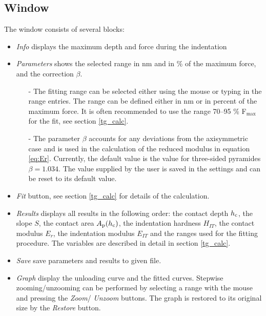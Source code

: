 \subsection{Window}
The window consists of several blocks:
\begin{itemize}
 \item \emph{Info} displays the maximum depth and force during the indentation
 \item \emph{Parameters} shows the selected range in nm and in \% of the maximum force, and the correction $\beta$. 
        \begin{itemize}
          \item[-] The fitting range can be selected either using the mouse or typing in the range entries. The range can be defined either in nm or in percent of the maximum force. 
                   It is often recommended to use the range 70--95 \% F$_\mathrm{max}$ for the fit, see section \ref{tg_calc}.  
          \item[-] The parameter $\beta$ accounts for any deviations from the axisymmetric case and is used in the calculation of the reduced modulus in equation \eqref{eq:Er}. 
                   Currently, the default value is the value for three-sided pyramides $\beta = 1.034$. The value supplied by the user is saved in the settings and can be reset to its default value.
        \end{itemize}
 \item \emph{Fit} button, see section \ref{tg_calc} for details of the calculation.
 \item \emph{Results} displays all results in the following order: the contact depth  $h_\mathrm{c}$, the slope $S$, the contact area $A_\mathrm{p}(h_\mathrm{c})$, the indentation hardness $H_{IT}$, the contact modulus $E_r$, the indentation modulus $E_{IT}$ and the ranges used for the fitting procedure.
       The variables are described in detail in section \ref{tg_calc}.
 \item \emph{Save} save parameters and results to given file. 
 \item \emph{Graph} display the unloading curve and the fitted curves. Stepwise zooming/unzooming can be performed by selecting a range with the mouse and pressing the \emph{Zoom}/ \emph{Unzoom} buttons. The graph is restored to its original size by the \emph{Restore} button.
\end{itemize}

